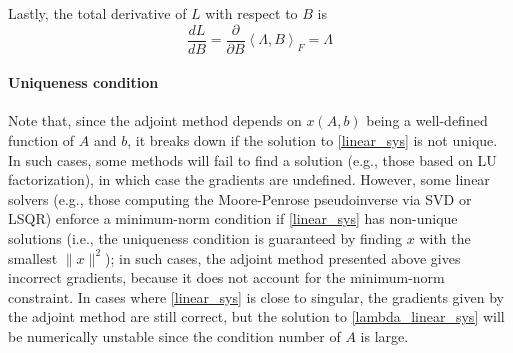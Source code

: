 \documentclass[11pt, a4paper]{article}
\begin{document}
Lastly, the total derivative of $L$ with respect to $B$ is
\begin{equation}
    \frac{dL}{dB} = \frac{\partial}{\partial B}\left<\Lambda, B\right>_F = \Lambda
\end{equation}

\paragraph{Uniqueness condition}
Note that, since the adjoint method depends on $x(A, b)$ being a well-defined function of $A$ and $b$, it breaks down if the solution to \eqref{linear_sys} is not unique. In such cases, some methods will fail to find a solution (e.g., those based on LU factorization), in which case the gradients are undefined. However, some linear solvers (e.g., those computing the Moore-Penrose pseudoinverse via SVD or LSQR) enforce a minimum-norm condition if \eqref{linear_sys} has non-unique solutions (i.e., the uniqueness condition is guaranteed by finding $x$ with the smallest $\|x\|^2$); in such cases, the adjoint method presented above gives incorrect gradients, because it does not account for the minimum-norm constraint. In cases where \eqref{linear_sys} is close to singular, the gradients given by the adjoint method are still correct, but the solution to \eqref{lambda_linear_sys} will be numerically unstable since the condition number of $A$ is large.
\end{document}
